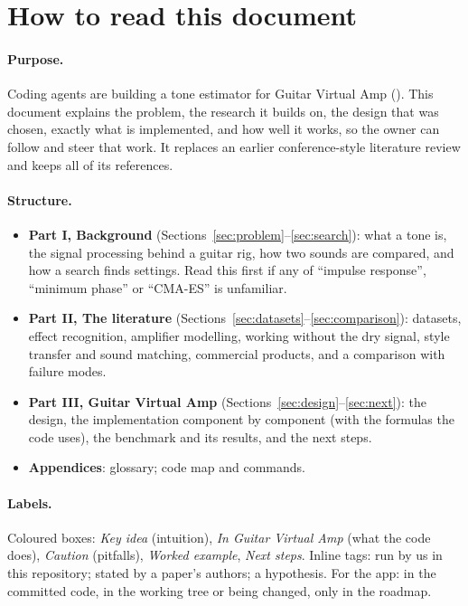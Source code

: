 \section*{How to read this document}

\paragraph{Purpose.} Coding agents are building a tone estimator for Guitar
Virtual Amp (). This document explains the problem,
the research it builds on, the design that was chosen, exactly what is
implemented, and how well it works, so the owner can follow and steer that
work. It replaces an earlier conference-style literature review and keeps all of
its references.

\paragraph{Structure.}
\begin{itemize}
\item \textbf{Part I, Background} (Sections~\ref{sec:problem}--\ref{sec:search}):
  what a tone is, the signal processing behind a guitar rig, how two sounds are
  compared, and how a search finds settings. Read this first if any of
  ``impulse response'', ``minimum phase'' or ``CMA-ES'' is unfamiliar.
\item \textbf{Part II, The literature} (Sections~\ref{sec:datasets}--\ref{sec:comparison}):
  datasets, effect recognition, amplifier modelling, working without the dry
  signal, style transfer and sound matching, commercial products, and a
  comparison with failure modes.
\item \textbf{Part III, Guitar Virtual Amp} (Sections~\ref{sec:design}--\ref{sec:next}):
  the design, the implementation component by component (with the formulas the
  code uses), the benchmark and its results, and the next steps.
\item \textbf{Appendices}: glossary; code map and commands.
\end{itemize}

\paragraph{Labels.} Coloured boxes: \emph{Key idea} (intuition), \emph{In Guitar
Virtual Amp} (what the code does), \emph{Caution} (pitfalls), \emph{Worked
example}, \emph{Next steps}. Inline tags: \measured{} run by us in this
repository; \reported{} stated by a paper's authors; \expected{} a hypothesis.
For the app: \done{} in the committed code, \wip{} in the working tree or being
changed, \planned{} only in the roadmap.

